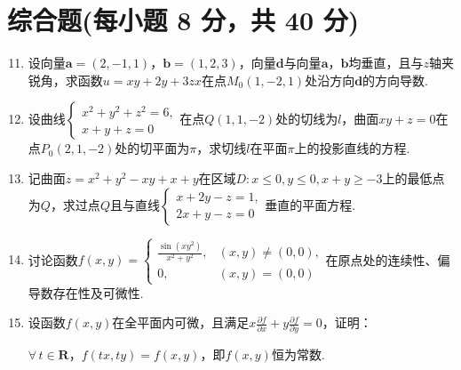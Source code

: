 \documentclass[../main.tex]{subfiles}
\begin{document}
\section{综合题(每小题 8 分，共 40 分)}
\begin{enumerate}
    \setcounter{enumi}{10}
    \item 设向量$\boldsymbol{a}=(2,-1,1)$，$\boldsymbol{b}=(1,2,3)$，向量$\boldsymbol
              {d}$与向量$\boldsymbol{a}$，$\boldsymbol{b}$均垂直，且与$z$轴夹锐角，求函数$u
              =xy+2y+3zx$在点$M_{0}(1,-2,1)$处沿方向$\boldsymbol{d}$的方向导数.
          \vspace{13em}

    \item 设曲线$\begin{cases}
                  x^{2}+y^{2}+z^{2}=6, \\
                  x+y+z=0
              \end{cases}$在点$Q(1,1,-2)$处的切线为$l$，曲面$xy+z=0$在点$P_{0}(2,1,-2)$处的切平面为$\pi$，求切线$l$在平面$\pi$上的投影直线的方程.
          \vspace{10em}

    \item 记曲面$z=x^{2}+y^{2}-xy+x+y$在区域$D:x\leq 0,y\leq 0,x+y\geq -3$上的最低点为$Q$，求过点$Q$且与直线$\begin{cases}
                  x+2y-z=1, \\
                  2x+y-z=0
              \end{cases}$垂直的平面方程.
          \vspace{10em}

    \item 讨论函数$f(x,y)=
              \begin{cases}
                  \frac{\sin(xy^{2})}{x^{2}+y^{2}}, & (x,y)\neq(0,0), \\
                  0,                                & (x,y)=(0,0)
              \end{cases}$在原点处的连续性、偏导数存在性及可微性.
          \vspace{10em}

    \item 设函数$f(x,y)$在全平面内可微，且满足$x\frac{\partial f}{\partial
                  x}+y\frac{\partial f}{\partial y}=0$，证明：

          $\forall\,t\in\mathbf{R}$，$f(tx,ty)=f(x,y)$，即$f(x,y)$恒为常数.
          \vspace{10em}
\end{enumerate}
\end{document}
